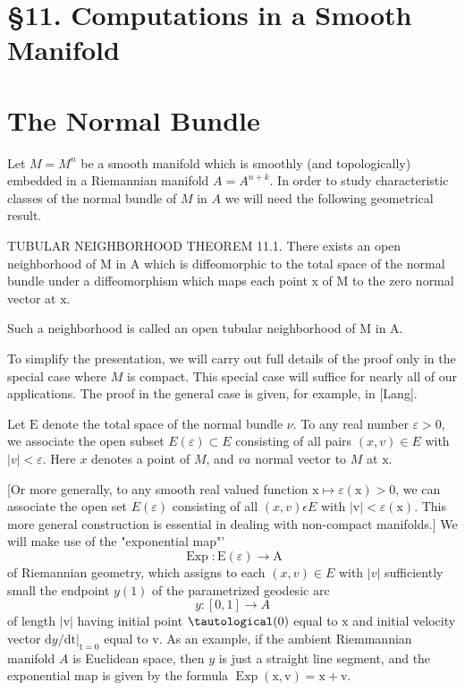 \documentclass[10pt]{article}
\begin{document}
\section{§11. Computations in a Smooth Manifold}
\section{The Normal Bundle}
Let $M=M^{n}$ be a smooth manifold which is smoothly (and topologically) embedded in a Riemannian manifold $A=A^{n+k}$. In order to study characteristic classes of the normal bundle of $M$ in $A$ we will need the following geometrical result.

TUBULAR NEIGHBORHOOD THEOREM 11.1. There exists an open neighborhood of $\mathrm{M}$ in $\mathrm{A}$ which is diffeomorphic to the total space of the normal bundle under a diffeomorphism which maps each point $\mathrm{x}$ of $\mathrm{M}$ to the zero normal vector at $\mathrm{x}$.

Such a neighborhood is called an open tubular neighborhood of $\mathrm{M}$ in $\mathrm{A}$.

To simplify the presentation, we will carry out full details of the proof only in the special case where $M$ is compact. This special case will suffice for nearly all of our applications. The proof in the general case is given, for example, in [Lang].

Let $\mathrm{E}$ denote the total space of the normal bundle $\nu$. To any real number $\varepsilon>0$, we associate the open subset $E(\varepsilon) \subset E$ consisting of all pairs $(x, v) \in E$ with $|v|<\varepsilon$. Here $x$ denotes a point of $M$, and $v a$ normal vector to $M$ at $\mathrm{x}$.

[Or more generally, to any smooth real valued function $\mathrm{x} \mapsto \varepsilon(\mathrm{x})>0$, we can associate the open set $E(\varepsilon)$ consisting of all $(x, v) \epsilon E$ with $|\mathrm{v}|<\varepsilon(\mathrm{x})$. This more general construction is essential in dealing with non-compact manifolds.] We will make use of the "exponential map"'
$$
\operatorname{Exp}: \mathrm{E}(\varepsilon) \rightarrow \mathrm{A}
$$
of Riemannian geometry, which assigns to each $(x, v) \in E$ with $|v|$ sufficiently small the endpoint $y(1)$ of the parametrized geodesic arc
$$
y:[0,1] \rightarrow A
$$
of length $|\mathrm{v}|$ having initial point $\tautological(0)$ equal to $\mathrm{x}$ and initial velocity vector $\mathrm{d} y /\left.\mathrm{dt}\right|_{\mathrm{t}=0}$ equal to $\mathrm{v}$. As an example, if the ambient Riemmannian manifold $A$ is Euclidean space, then $y$ is just a straight line segment, and the exponential map is given by the formula $\operatorname{Exp}(\mathrm{x}, \mathrm{v})=\mathrm{x}+\mathrm{v}$.
\end{document}
